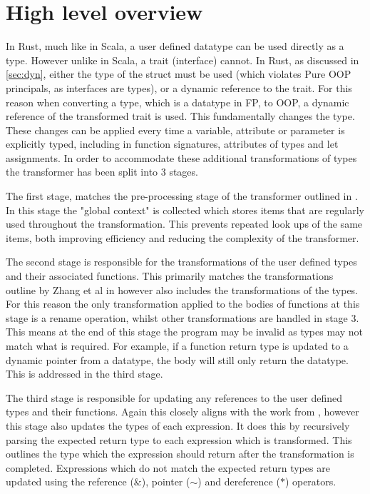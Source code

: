 \documentclass[ oneside,%
                    author={James Elgar},
                    degree={MEng},
                     title={Bidirectional transformer between functional and \\ object-oriented programming in Rust},
                  subtitle={}]{dissertation}
\newcommand{\weixin}{Zhang et al }
\begin{document}
\section{High level overview}

In Rust, much like in Scala, a user defined datatype can be used directly as a type. However unlike in Scala, a trait (interface) cannot. In Rust, as discussed in \autoref{sec:dyn}, either the type of the struct must be used (which violates Pure OOP principals, as interfaces are types), or a dynamic reference to the trait. For this reason when converting a type, which is a datatype in FP, to OOP, a dynamic reference of the transformed trait is used. This fundamentally changes the type. These changes can be applied every time a variable, attribute or parameter is explicitly typed, including in function signatures, attributes of types and let assignments.
In order to accommodate these additional transformations of types the transformer has been split into 3 stages. 

The first stage, matches the pre-processing stage of the transformer outlined in \cite{food}. In this stage the "global context" is collected which stores items that are regularly used throughout the transformation. This prevents repeated look ups of the same items, both improving efficiency and reducing the complexity of the transformer.


The second stage is responsible for the transformations of the user defined types and their associated functions. This primarily matches the transformations outline by \weixin in \cite{food} however also includes the transformations of the types. For this reason the only transformation applied to the bodies of functions at this stage is a rename operation, whilst other transformations are handled in stage 3. This means at the end of this stage the program may be invalid as types may not match what is required. For example, if a function return type is updated to a dynamic pointer from a datatype, the body will still only return the datatype. This is addressed in the third stage.

The third stage is responsible for updating any references to the user defined types and their functions. Again this closely aligns with the work from \cite{food}, however this stage also updates the types of each expression. It does this by recursively parsing the expected return type to each expression which is transformed. This outlines the type which the expression should return after the transformation is completed. Expressions which do not match the expected return types are updated using the reference ($\&$), pointer ($\sim$) and dereference ($*$) operators. 
\end{document}
